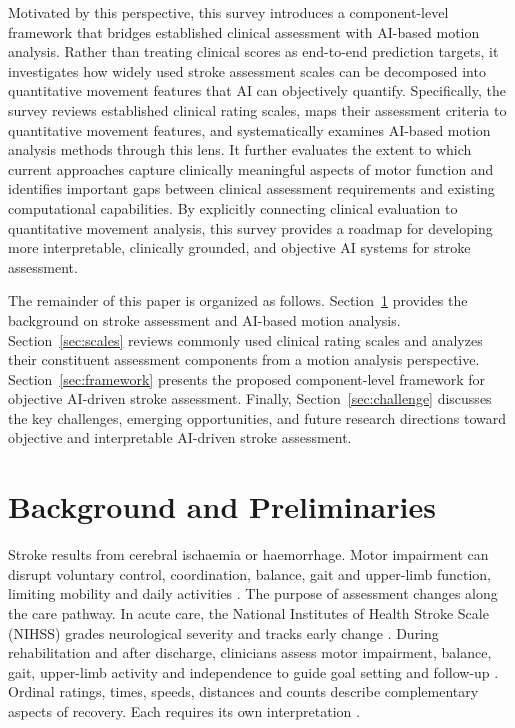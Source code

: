 \documentclass[11pt]{article}
\begin{document}
Motivated by this perspective, this survey introduces a component-level framework that bridges established clinical assessment with AI-based motion analysis. Rather than treating clinical scores as end-to-end prediction targets, it investigates how widely used stroke assessment scales can be decomposed into quantitative movement features that AI can objectively quantify. Specifically, the survey reviews established clinical rating scales, maps their assessment criteria to quantitative movement features, and systematically examines AI-based motion analysis methods through this lens. It further evaluates the extent to which current approaches capture clinically meaningful aspects of motor function and identifies important gaps between clinical assessment requirements and existing computational capabilities. By explicitly connecting clinical evaluation to quantitative movement analysis, this survey provides a roadmap for developing more interpretable, clinically grounded, and objective AI systems for stroke assessment.

The remainder of this paper is organized as follows. Section~\ref{sec:background} provides the background on stroke assessment and AI-based motion analysis. Section~\ref{sec:scales} reviews commonly used clinical rating scales and analyzes their constituent assessment components from a motion analysis perspective. Section~\ref{sec:framework} presents the proposed component-level framework for objective AI-driven stroke assessment. Finally, Section~\ref{sec:challenge} discusses the key challenges, emerging opportunities, and future research directions toward objective and interpretable AI-driven stroke assessment.


\section{Background and Preliminaries}
\label{sec:background}

Stroke results from cerebral ischaemia or haemorrhage. Motor impairment can disrupt voluntary control, coordination, balance, gait and upper-limb function, limiting mobility and daily activities \cite{WHO2025StrokeFactSheet,S1VADoD2024StrokeRehab}. The purpose of assessment changes along the care pathway. In acute care, the National Institutes of Health Stroke Scale (NIHSS) grades neurological severity and tracks early change \cite{S1Prabhakaran2026AHAASAAIS,ScaleBrott1989NIHSS}. During rehabilitation and after discharge, clinicians assess motor impairment, balance, gait, upper-limb activity and independence to guide goal setting and follow-up \cite{S1Winstein2016AHAASARehab,S1VADoD2024StrokeRehab,S1NICE2023NG236}. Ordinal ratings, times, speeds, distances and counts describe complementary aspects of recovery. Each requires its own interpretation \cite{ScaleHarrison2013Clinimetric,CoreKwakkel2017SRRRSensorimotor,CoreVanCriekinge2024SRRRBalanceMobility}.
\end{document}
